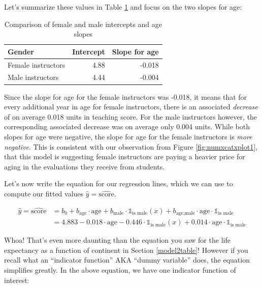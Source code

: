 \documentclass[12pt, krantz2,]{krantz}
\begin{document}
Let's summarize these values in Table \ref{tab:interaction-summary} and focus on the two slopes for age:

\begin{table}[H]

\caption{\label{tab:interaction-summary}Comparison of female and male intercepts and age slopes}
\centering
\fontsize{10}{12}\selectfont
\begin{tabular}{lrr}
\toprule
Gender & Intercept & Slope for age\\
\midrule
Female instructors & 4.88 & -0.018\\
Male instructors & 4.44 & -0.004\\
\bottomrule
\end{tabular}
\end{table}

Since the slope for age for the female instructors was -0.018, it means that for every additional year in age for female instructors, there is an associated \emph{decrease} of on average 0.018 units in teaching score. For the male instructors however, the corresponding associated decrease was on average only 0.004 units. While both slopes for age were negative, the slope for age for the female instructors is \emph{more negative}. This is consistent with our observation from Figure \ref{fig:numxcatxplot1}, that this model is suggesting female instructors are paying a heavier price for aging in the evaluations they receive from students.

Let's now write the equation for our regression lines, which we can use to compute our fitted values \(\widehat{y} = \widehat{\text{score}}\).

\[
\begin{aligned}
\widehat{y} = \widehat{\text{score}} &= b_0 + b_{\mbox{age}} \cdot \mbox{age} + b_{\mbox{male}} \cdot \mathbb{1}_{\mbox{is male}}(x) + b_{\mbox{age,male}} \cdot \mbox{age} \cdot \mathbb{1}_{\mbox{is male}}\\
&= 4.883 -0.018 \cdot \mbox{age} - 0.446 \cdot \mathbb{1}_{\mbox{is male}}(x) + 0.014 \cdot \mbox{age} \cdot \mathbb{1}_{\mbox{is male}}
\end{aligned}
\]

Whoa! That's even more daunting than the equation you saw for the life expectancy as a function of continent in Section \ref{model2table}! However if you recall what an ``indicator function'' AKA ``dummy variable'' does, the equation simplifies greatly. In the above equation, we have one indicator function of interest:
\end{document}
